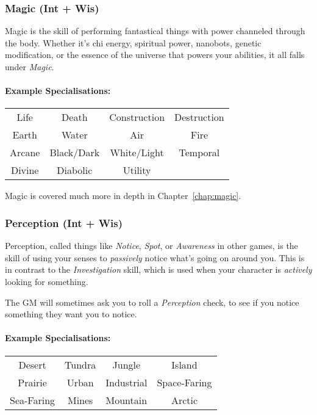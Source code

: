 \subsubsection{Magic (Int + Wis)}
Magic is the skill of performing fantastical things with power channeled through the body.
Whether it's chi energy, spiritual power, nanobots, genetic modification, or the essence of the universe that powers your abilities, it all falls under \textit{Magic}.

\paragraph{Example Specialisations:}
\begin{center}
  \begin{tabular}{c|c|c|c}
    Life  & Death & Construction & Destruction \\
    Earth & Water & Air & Fire \\
    Arcane & Black/Dark & White/Light & Temporal \\
    Divine & Diabolic   & Utility
  \end{tabular}
\end{center}
Magic is covered much more in depth in Chapter~\ref{chap:magic}.

\subsubsection{Perception (Int + Wis)}
Perception, called things like \textit{Notice}, \textit{Spot}, or \textit{Awareness} in other games, is the skill of using your senses to \textit{passively} notice what's going on around you.
This is in contrast to the \textit{Investigation} skill, which is used when your character is \textit{actively} looking for something.

The GM will sometimes ask you to roll a \textit{Perception} check, to see if you notice something they want you to notice.

\paragraph{Example Specialisations:}
\begin{center}
    \begin{tabular}{c|c|c|c}
        Desert & Tundra & Jungle & Island \\
        Prairie & Urban & Industrial & Space-Faring \\
        Sea-Faring & Mines & Mountain & Arctic \\
    \end{tabular}
\end{center}

